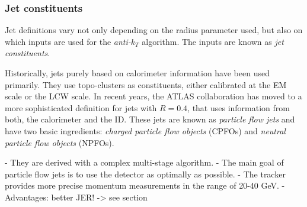 \subsubsection{Jet constituents}
Jet definitions vary not only depending on the radius parameter used, but also on which inputs are used for the \emph{anti-$k_T$} algorithm. The inputs are known as \emph{jet constituents}. 

Historically, jets purely based on calorimeter information have been used primarily. They use topo-clusters as constituents, either calibrated at the EM scale or the LCW scale. 
In recent years, the ATLAS collaboration has moved to a more sophisticated definition for jets with $R=0.4$, that uses information from both, the calorimeter and the ID. These jets are known as \emph{particle flow jets} and have two basic ingredients: \emph{charged particle flow objects} (CPFOs) and \emph{neutral particle flow objects} (NPFOs). 

- They are derived with a complex multi-stage algorithm. 
- The main goal of particle flow jets is to use the detector as optimally as possible. 
- The tracker provides more precise momentum measurements in the range of 20-40 GeV. 
- Advantages: better JER! -> see section



